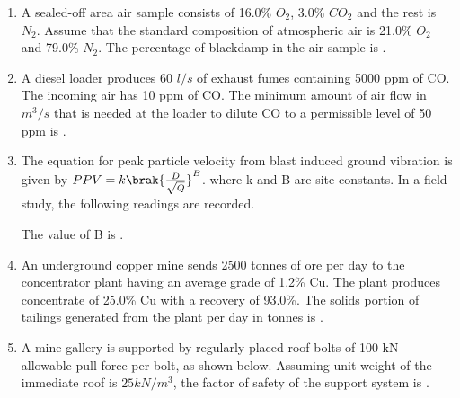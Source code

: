\documentclass[journal,12pt,onecolumn]{IEEEtran}
\theoremstyle{remark}
\begin{document}
\begin{enumerate}
\hfill{}

\item A sealed-off area air sample consists of 16.0\% $O_{2}$, 3.0\% $CO_{2}$ and the rest is $N_{2}$. Assume that the standard composition of atmospheric air is 21.0\% $O_{2}$ and 79.0\% $N_{2}$. The percentage of blackdamp in the air sample is \underline{\hspace{2cm}} .

\hfill{}

\item A diesel loader produces 60 $l/s$ of exhaust fumes containing 5000 ppm of CO. The incoming air has 10 ppm of CO. The minimum amount of air flow in $m^{3}/s$ that is needed at the loader to dilute CO to a permissible level of 50 ppm is \underline{\hspace{2cm}} .

\hfill{}

\item The equation for peak particle velocity  from blast induced ground vibration is given by
$PPV=k\brak{\frac{D}{\sqrt{Q}}}^{B}$.
where k and B are site constants.
In a field study, the following readings are recorded.

The value of B is \underline{\hspace{2cm}} .

\hfill{}

\item An underground copper mine sends 2500 tonnes of ore per day to the concentrator plant having an average grade of 1.2\% Cu. The plant produces concentrate of 25.0\% Cu with a recovery of 93.0\%. The solids portion of tailings generated from the plant per day in tonnes is \underline{\hspace{2cm}} .

\hfill{}

\item A mine gallery is supported by regularly placed roof bolts of 100 kN allowable pull force per bolt, as shown below. Assuming unit weight of the immediate roof is $25 kN /m^{3}$, the factor of safety of the support system is \underline{\hspace{2cm}} .


\end{enumerate}
\end{document}
